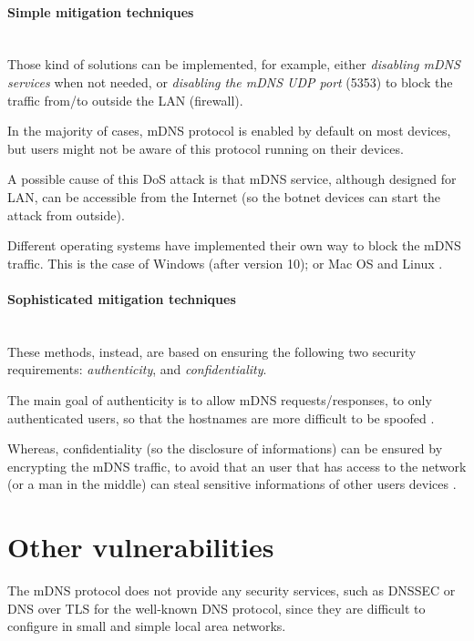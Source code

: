 \documentclass[fleqn, 11pt]{SelfArx} %
\begin{document}
\paragraph{Simple mitigation techniques}\mbox{}\\
Those kind of solutions can be implemented, for example, either {\it{disabling mDNS services}} when not needed, or
{\it{disabling the mDNS UDP port}} (5353) to block the traffic from/to outside the LAN (firewall).

In the majority of cases, mDNS protocol is enabled by default on most devices, but users might not be aware of this protocol running on their devices.

A possible cause of this DoS attack is that mDNS service, although designed for LAN, can be accessible from the Internet (so the botnet devices can start the attack from outside).

Different operating systems have implemented their own way to block the mDNS traffic. This is the case of Windows \cite{blockWindowsMDNS}  (after version 10); or Mac OS and Linux \cite{blockMacOsLinuxMDNS}.

\paragraph{Sophisticated mitigation techniques}\mbox{}\\
These methods, instead, are based on ensuring the following two security requirements: {\it{authenticity}}, and {\it{confidentiality}}.

The main goal of authenticity is to allow mDNS requests/responses, to only authenticated users, so that the hostnames are more difficult to be spoofed \cite{Bai2016StayingSA, Bai2017AppleZH, WuTSB16}.

Whereas, confidentiality (so the disclosure of informations) can be ensured by encrypting the mDNS traffic, to avoid that an user that has access to the network (or a man in the middle) can steal sensitive informations of other users devices \cite{Kaiser2014AddingPT, EfficientmDNS}.

\section{Other vulnerabilities}
The mDNS protocol does not provide any security services, such as DNSSEC or DNS over TLS for the well-known DNS protocol, since they are difficult to configure in small and simple local area networks. 
\end{document}
